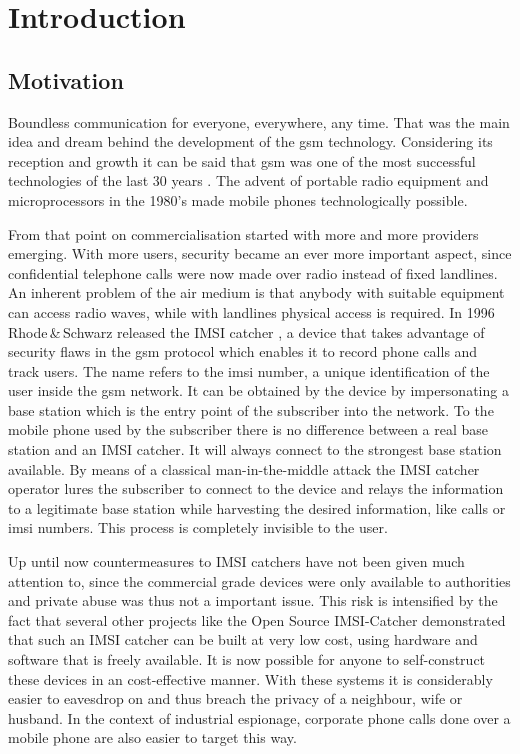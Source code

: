 \chapter{Introduction}

\section{Motivation}
Boundless communication for everyone, everywhere, any time.
That was the main idea and dream behind the development of the \gls{gsm} technology.
Considering its reception and growth it can be said that \gls{gsm} was one of the most successful technologies of the last 30 years \cite{GSM2009,GSM_history2011,GSM_stats2011}.
The advent of portable radio equipment and microprocessors in the 1980's made mobile phones technologically possible.

From that point on commercialisation started with more and more providers emerging.
With more users, security became an ever more important aspect, since confidential telephone calls were now made over radio instead of fixed landlines.
An inherent problem of the air medium is that anybody with suitable equipment can access radio waves, while with landlines physical access is required.
In 1996 Rhode\,\&\,Schwarz released the IMSI catcher \cite{fox}, a device that takes advantage of security flaws in the \gls{gsm} protocol which enables it to record phone calls and track users.
The name refers to the \gls{imsi} number, a unique identification of the user inside the \gls{gsm} network.
It can be obtained by the device by impersonating a base station which is the entry point of the subscriber into the network.
To the mobile phone used by the subscriber there is no difference between a real base station and an IMSI catcher.
It will always connect to the strongest base station available.
By means of a classical man-in-the-middle attack the IMSI catcher operator lures the subscriber to connect to the device and relays the information to a legitimate base station while harvesting the desired information, like calls or \gls{imsi} numbers.
This process is completely invisible to the user.


Up until now countermeasures to IMSI catchers have not been given much attention to, since the commercial grade devices were only available to authorities and private abuse was thus not a important issue.
This risk is intensified by the fact that several other projects like the Open Source IMSI-Catcher \cite{dennis} demonstrated that such an IMSI catcher can be built at very low cost, using hardware and software that is freely available.
It is now possible for anyone to self-construct these devices in an cost-effective manner.
With these systems it is considerably easier to eavesdrop on and thus breach the privacy of a neighbour, wife or husband.
In the context of industrial espionage, corporate phone calls done over a mobile phone are also easier to target this way.

